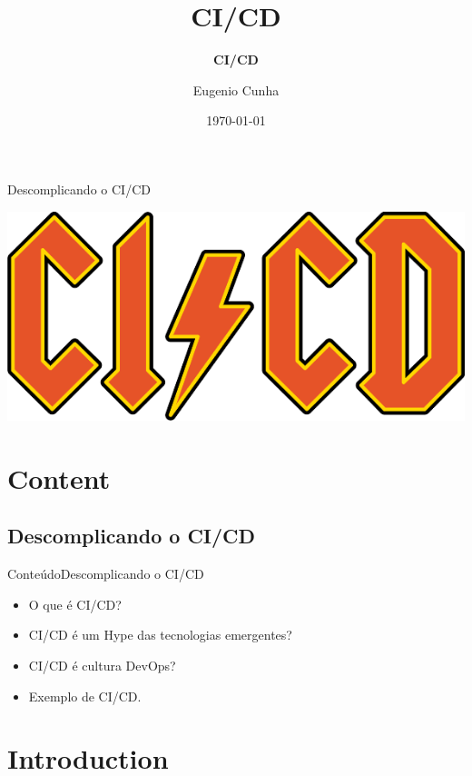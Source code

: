 \documentclass[10pt]{beamer}
\title[] %
{ %
      \textbf{CI/CD}
}
\subtitle[Descomplicando o CI/CD]
{
      \textbf{CI/CD}
}
\author[Eugenio Cunha]
{      Eugenio Cunha
      {}
}
\institute[]
{
      TWT Info
}
\date{\today}
\begin{document}




\begin{frame}{Descomplicando o CI/CD}{}
    \begin{center}
        \includegraphics[scale=0.3]{images/cicd}
    \end{center}
\end{frame}

\section{Content}

\subsection{Descomplicando o CI/CD}
\begin{frame}{Conteúdo}{Descomplicando o CI/CD}
  \begin{itemize}
    \item O que é CI/CD?
    \item CI/CD é um Hype das tecnologias emergentes?
    \item CI/CD é cultura DevOps?
    \item Exemplo de CI/CD.
  \end{itemize}
\end{frame}

\section{Introduction}
\end{document}
